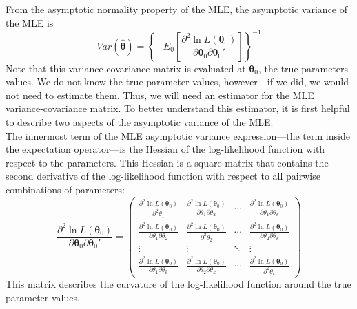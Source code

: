 \documentclass[11pt,letterpaper]{article}
\begin{document}
From the asymptotic normality property of the MLE, the asymptotic variance of the MLE is
$$Var(\widehat{\bm{\theta}}) = \left\{ -E_0 \left[ \frac{\partial^2 \ln L(\bm{\theta}_0)}{\partial \bm{\theta}_0 \partial \bm{\theta}_0'} \right] \right\}^{-1}$$
Note that this variance-covariance matrix is evaluated at $\bm{\theta}_0$, the true parameters values. We do not know the true parameter values, however---if we did, we would not need to estimate them. Thus, we will need an estimator for the MLE variance-covariance matrix. To better understand this estimator, it is first helpful to describe two aspects of the asymptotic variance of the MLE. \\

\noindent The innermost term of the MLE asymptotic variance expression---the term inside the expectation operator---is the Hessian of the log-likelihood function with respect to the parameters. This Hessian is a square matrix that contains the second derivative of the log-likelihood function with respect to all pairwise combinations of parameters:
$$\frac{\partial^2 \ln L(\bm{\theta}_0)}{\partial \bm{\theta}_0 \partial \bm{\theta}_0'} = \begin{pmatrix}
  \frac{\partial^2 \ln L(\bm{\theta}_0)}{\partial^2 \theta_1} & \frac{\partial^2 \ln L(\bm{\theta}_0)}{\partial \theta_1 \partial \theta_2} & \cdots & \frac{\partial^2 \ln L(\bm{\theta}_0)}{\partial \theta_1 \partial \theta_k} \\
  \frac{\partial^2 \ln L(\bm{\theta}_0)}{\partial \theta_1 \partial \theta_2} & \frac{\partial^2 \ln L(\bm{\theta}_0)}{\partial^2 \theta_2} & \cdots & \frac{\partial^2 \ln L(\bm{\theta}_0)}{\partial \theta_2 \partial \theta_k} \\
  \vdots & \vdots & \ddots & \vdots \\
  \frac{\partial^2 \ln L(\bm{\theta}_0)}{\partial \theta_1 \partial \theta_k} & \frac{\partial^2 \ln L(\bm{\theta}_0)}{\partial \theta_2 \partial \theta_k} & \cdots & \frac{\partial^2 \ln L(\bm{\theta}_0)}{\partial^2 \theta_k}
\end{pmatrix}$$
This matrix describes the curvature of the log-likelihood function around the true parameter values. \\
\end{document}
